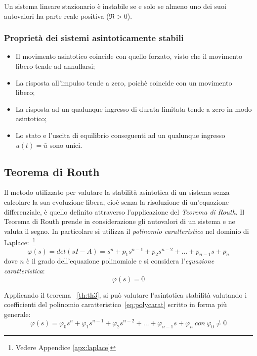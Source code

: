 \documentclass[a4paper]{report}
\begin{document}
\begin{Th4}\label{th:th4}
  Un sistema lineare stazionario \`e instabile se e solo se almeno uno
  dei suoi autovalori ha parte reale positiva ($\Re>0$).
\end{Th4}

\subsubsection{Propriet\`a dei sistemi asintoticamente stabili}
\begin{itemize}
\item Il movimento asintotico coincide con quello forzato, visto che
  il movimento libero tende ad annullarsi;
\item La risposta all'impulso tende a zero, poich\`e coincide con un
  movimento libero;
\item La risposta ad un qualunque ingresso di durata limitata tende a
  zero in modo asintotico;
\item Lo stato e l'uscita di equilibrio conseguenti ad un qualunque
  ingresso $u(t) = \bar{u}$ sono unici.
\end{itemize}

\subsection{Teorema di Routh}\label{pg:routh}
Il metodo utilizzato per valutare la stabilit\`a asintotica di un
sistema senza calcolare la sua evoluzione libera, cio\`e senza la
risoluzione di un'equazione differenziale, \`e quello definito
attraverso l'applicazione del \textsl{Teorema di Routh}.
Il Teorema di Routh prende in considerazione gli autovalori di un
sistema e ne valuta il segno. In particolare si utilizza il
\emph{polinomio caratteristico} nel dominio di Laplace:~\footnote{Vedere Appendice \ref{apx:laplace}}
\begin{equation}\label{eq:polycarat}
  \varphi(s)=det(sI-A)=s^n+p_1s^{n-1}+p_2s^{n-2}+\ldots+p_{n-1}s+p_n
\end{equation}
dove $n$ \`e il grado dell'equazione polinomiale e si considera l'\emph{equazione caratteristica}:
\begin{displaymath}
  \varphi(s)=0
\end{displaymath}

Applicando il teorema ~\ref{th:th3}, si pu\`o valutare l'asintotica
stabilit\`a valutando i coefficienti del polinomio
caratteristico~\ref{eq:polycarat} scritto in forma pi\`u generale:
\begin{equation}\label{eq:polycaratgen}
  \varphi(s)=\varphi_0 s^n+\varphi_1s^{n-1}+\varphi_2s^{n-2}+\ldots+\varphi_{n-1}s+\varphi_n ~con ~\varphi_0 \ne 0
\end{equation}
\end{document}
